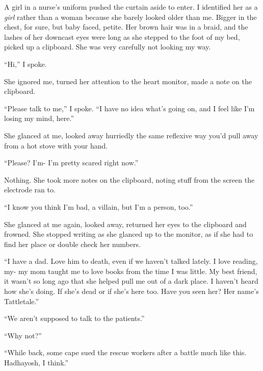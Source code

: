 A girl in a nurse's uniform pushed the curtain aside to enter.  I identified her as a \emph{girl} rather than a woman because she barely looked older than me.  Bigger in the chest, for sure, but baby faced, petite.  Her brown hair was in a braid, and the lashes of her downcast eyes were long as she stepped to the foot of my bed, picked up a clipboard.  She was very carefully not looking my way.



``Hi,'' I spoke.



She ignored me, turned her attention to the heart monitor, made a note on the clipboard.



``Please talk to me,'' I spoke.  ``I have no idea what's going on, and I feel like I'm losing my mind, here.''



She glanced at me, looked away hurriedly the same reflexive way you'd pull away from a hot stove with your hand.



``Please?  I'm-  I'm pretty scared right now.''



Nothing.  She took more notes on the clipboard, noting stuff from the screen the electrode ran to.



``I know you think I'm bad, a villain, but I'm a person, too.''



She glanced at me again, looked away, returned her eyes to the clipboard and frowned.  She stopped writing as she glanced up to the monitor, as if she had to find her place or double check her numbers.



``I have a dad.  Love him to death, even if we haven't talked lately.  I love reading, my- my mom taught me to love books from the time I was little.  My best friend, it wasn't so long ago that she helped pull me out of a dark place.  I haven't heard how she's doing.  If she's dead or if she's here too.  Have you seen her?  Her name's Tattletale.''



``We aren't supposed to talk to the patients.''



``Why not?''



``While back, some cape sued the rescue workers after a battle much like this.  Hadhayosh, I think.''



